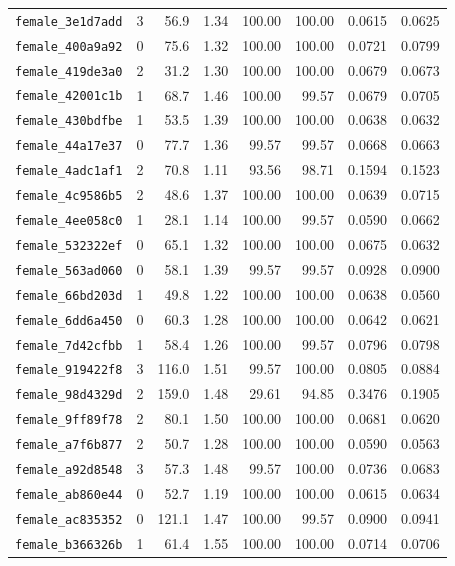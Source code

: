\begin{longtable}{lrrrrrrr}
\texttt{female\_3e1d7add} & 3 & 56.9 & 1.34 & 100.00 & 100.00 & 0.0615 & 0.0625 \\
\texttt{female\_400a9a92} & 0 & 75.6 & 1.32 & 100.00 & 100.00 & 0.0721 & 0.0799 \\
\texttt{female\_419de3a0} & 2 & 31.2 & 1.30 & 100.00 & 100.00 & 0.0679 & 0.0673 \\
\texttt{female\_42001c1b} & 1 & 68.7 & 1.46 & 100.00 & 99.57 & 0.0679 & 0.0705 \\
\texttt{female\_430bdfbe} & 1 & 53.5 & 1.39 & 100.00 & 100.00 & 0.0638 & 0.0632 \\
\texttt{female\_44a17e37} & 0 & 77.7 & 1.36 & 99.57 & 99.57 & 0.0668 & 0.0663 \\
\texttt{female\_4adc1af1} & 2 & 70.8 & 1.11 & 93.56 & 98.71 & 0.1594 & 0.1523 \\
\texttt{female\_4c9586b5} & 2 & 48.6 & 1.37 & 100.00 & 100.00 & 0.0639 & 0.0715 \\
\texttt{female\_4ee058c0} & 1 & 28.1 & 1.14 & 100.00 & 99.57 & 0.0590 & 0.0662 \\
\texttt{female\_532322ef} & 0 & 65.1 & 1.32 & 100.00 & 100.00 & 0.0675 & 0.0632 \\
\texttt{female\_563ad060} & 0 & 58.1 & 1.39 & 99.57 & 99.57 & 0.0928 & 0.0900 \\
\texttt{female\_66bd203d} & 1 & 49.8 & 1.22 & 100.00 & 100.00 & 0.0638 & 0.0560 \\
\texttt{female\_6dd6a450} & 0 & 60.3 & 1.28 & 100.00 & 100.00 & 0.0642 & 0.0621 \\
\texttt{female\_7d42cfbb} & 1 & 58.4 & 1.26 & 100.00 & 99.57 & 0.0796 & 0.0798 \\
\texttt{female\_919422f8} & 3 & 116.0 & 1.51 & 99.57 & 100.00 & 0.0805 & 0.0884 \\
\texttt{female\_98d4329d} & 2 & 159.0 & 1.48 & 29.61 & 94.85 & 0.3476 & 0.1905 \\
\texttt{female\_9ff89f78} & 2 & 80.1 & 1.50 & 100.00 & 100.00 & 0.0681 & 0.0620 \\
\texttt{female\_a7f6b877} & 2 & 50.7 & 1.28 & 100.00 & 100.00 & 0.0590 & 0.0563 \\
\texttt{female\_a92d8548} & 3 & 57.3 & 1.48 & 99.57 & 100.00 & 0.0736 & 0.0683 \\
\texttt{female\_ab860e44} & 0 & 52.7 & 1.19 & 100.00 & 100.00 & 0.0615 & 0.0634 \\
\texttt{female\_ac835352} & 0 & 121.1 & 1.47 & 100.00 & 99.57 & 0.0900 & 0.0941 \\
\texttt{female\_b366326b} & 1 & 61.4 & 1.55 & 100.00 & 100.00 & 0.0714 & 0.0706 \\

\end{longtable}
